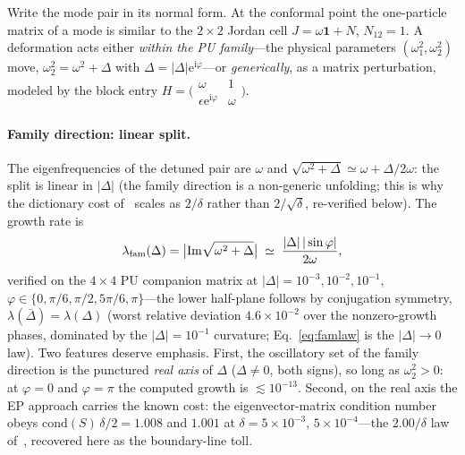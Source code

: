 ﻿\documentclass[11pt]{article}
\newcommand{\ee}{\mathrm{e}}
\newcommand{\ii}{\mathrm{i}}
\theoremstyle{remark}
\begin{document}
Write the mode pair in its normal form. At the conformal point the
one-particle matrix of a mode is similar to the $2\times2$ Jordan
cell $J=\omega\mathbf 1+N$, $N_{12}=1$. A deformation acts either
\emph{within the PU family}---the physical parameters
$(\omega_1^2,\omega_2^2)$ move, $\omega_2^2=\omega^2+\Delta$ with
$\Delta=|\Delta|\ee^{\ii\varphi}$---or \emph{generically}, as a
matrix perturbation, modeled by the block entry
$H=\bigl(\begin{smallmatrix}\omega&1\\ \epsilon\ee^{\ii\varphi}&
\omega\end{smallmatrix}\bigr)$.

\paragraph{Family direction: linear split.} The eigenfrequencies of
the detuned pair are $\omega$ and
$\sqrt{\omega^2+\Delta}\simeq\omega+\Delta/2\omega$: the split is
linear in $|\Delta|$ (the family direction is a non-generic
unfolding; this is why the dictionary cost of~\cite{choosing}
scales as $2/\delta$ rather than $2/\sqrt\delta$, re-verified below).
The growth rate is
\begin{equation}
\lambda_{\rm fam}(\Delta)=\bigl|\mathrm{Im}\sqrt{\omega^2+\Delta}
\bigr|\;\simeq\;\frac{|\Delta|\,|\sin\varphi|}{2\omega},
\label{eq:famlaw}
\end{equation}
verified on the $4\times4$ PU companion matrix at
$|\Delta|=10^{-3},10^{-2},10^{-1}$, $\varphi\in\{0,\pi/6,\pi/2,
5\pi/6,\pi\}$---the lower half-plane follows by conjugation
symmetry, $\lambda(\bar\Delta)=\lambda(\Delta)$ (worst relative
deviation $4.6\times10^{-2}$ over the nonzero-growth phases,
dominated by
the $|\Delta|=10^{-1}$ curvature; Eq.~\eqref{eq:famlaw} is the
$|\Delta|\to0$ law). Two features deserve emphasis. First, the
oscillatory set of the family direction is the punctured \emph{real
axis} of $\Delta$ ($\Delta\neq0$, both signs), so long as $\omega_2^2>0$: at
$\varphi=0$ and $\varphi=\pi$ the computed growth is
$\lesssim10^{-13}$. Second, on the real axis the EP approach carries
the known cost: the eigenvector-matrix condition number obeys
$\mathrm{cond}(S)\,\delta/2=1.008$ and $1.001$ at
$\delta=5\times10^{-3},\,5\times10^{-4}$---the $2.00/\delta$ law
of~\cite{choosing}, recovered here as the boundary-line toll.
\end{document}
